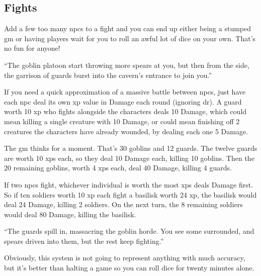 \begin{multicols}{2}
\subsection{ Fights}
\label{npcfights}

Add a few too many \glspl{npc} to a fight and you can end up either being a stumped \gls{gm} or having players wait for you to roll an awful lot of dice on your own.
That's no fun for anyone!

\begin{exampletext}

  ``The goblin platoon start throwing more spears at you, but then from the side, the garrison of guards burst into the cavern's entrance to join you.''

\end{exampletext}

If you need a quick approximation of a massive battle between \glspl{npc}, just have each \gls{npc} deal its own \gls{xp} value in Damage each round (ignoring \gls{dr}).
A guard worth 10 \gls{xp} who fights alongside the characters deals 10 Damage, which could mean killing a single creature with 10 Damage, or could mean finishing off 2 creatures the characters have already wounded, by dealing each one 5 Damage.

\begin{exampletext}

  The \gls{gm} thinks for a moment.
  That's 30 goblins and 12 guards.
  The twelve guards are worth 10 \glspl{xp} each, so they deal 10 Damage each, killing 10 goblins.
  Then the 20 remaining goblins, worth 4 \glspl{xp} each, deal 40 Damage, killing 4 guards.

\end{exampletext}

If two \glspl{npc} fight, whichever individual is worth the most \glspl{xp} deals Damage first.
So if ten soldiers worth 10 \gls{xp} each fight a basilisk worth 24 \gls{xp}, the basilisk would deal 24 Damage, killing 2 soldiers.
On the next turn, the 8 remaining soldiers would deal 80 Damage, killing the basilisk.

\begin{exampletext}

  ``The guards spill in, massacring the goblin horde.
  You see some surrounded, and spears driven into them, but the rest keep fighting.''

\end{exampletext}

Obviously, this system is not going to represent anything with much accuracy, but it's better than halting a game so you can roll dice for twenty minutes alone.


\end{multicols}
